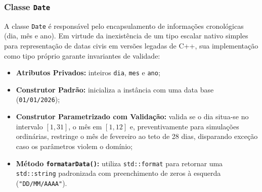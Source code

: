 \documentclass[12pt,a4paper]{article}
\begin{document}
\subsubsection{Classe \texttt{Date}}
A classe \texttt{Date} é responsável pelo encapsulamento de informações cronológicas (dia, mês e ano). Em virtude da inexistência de um tipo escalar nativo simples para representação de datas civis em versões legadas de C++, sua implementação como tipo próprio garante invariantes de validade:
\begin{itemize}
    \item \textbf{Atributos Privados:} inteiros \texttt{dia}, \texttt{mes} e \texttt{ano};
    \item \textbf{Construtor Padrão:} inicializa a instância com uma data base (\texttt{01/01/2026});
    \item \textbf{Construtor Parametrizado com Validação:} valida se o dia situa-se no intervalo $[1, 31]$, o mês em $[1, 12]$ e, preventivamente para simulações ordinárias, restringe o mês de fevereiro ao teto de 28 dias, disparando exceção caso os parâmetros violem o domínio;
    \item \textbf{Método \texttt{formatarData()}:} utiliza \texttt{std::format} para retornar uma \texttt{std::string} padronizada com preenchimento de zeros à esquerda (\texttt{"DD/MM/AAAA"}).
\end{itemize}
\end{document}
